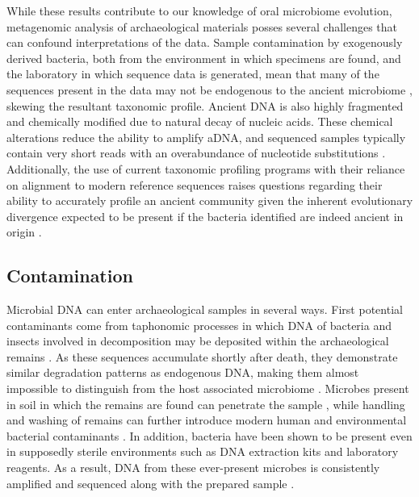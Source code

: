 \documentclass[12pt, a4paper]{article}
\begin{document}
While these results contribute to our knowledge of oral microbiome evolution, metagenomic analysis of archaeological materials posses several challenges that can confound interpretations of the data. 
Sample contamination by exogenously derived bacteria, both from the environment in which specimens are found, and the laboratory in which sequence data is generated, mean that many of the sequences present in the data may not be endogenous to the ancient microbiome \cite{Cooper:2000aa,Handt:1994aa}, skewing the resultant taxonomic profile. 
Ancient DNA is also highly fragmented and chemically modified due to natural decay of nucleic acids.
These chemical alterations reduce the ability to amplify aDNA, and sequenced samples typically contain very short reads with an overabundance  of nucleotide substitutions \cite{Briggs:2007aa}. 
Additionally, the use of current taxonomic profiling programs with their reliance on alignment to modern reference sequences \cite{Herbig2016} raises questions regarding their ability to accurately profile an ancient community given the inherent evolutionary divergence expected to be present if the bacteria identified are indeed ancient in origin \cite{Eisenhofer:2016aa}.

\subsection{Contamination}\label{sec:contamination}
Microbial DNA can enter archaeological samples in several ways. 
First potential contaminants come from taphonomic processes in which DNA of bacteria and insects involved in decomposition may be deposited within the archaeological remains \cite{Noonan:2005aa,Poinar:2006aa}. 
As these sequences accumulate shortly after death, they demonstrate similar degradation patterns as endogenous DNA, making them almost impossible to distinguish from the host associated microbiome \cite{Herbig2016}. 
Microbes present in soil in which the remains are found can penetrate the sample \cite{Noonan:2005aa}, while handling and washing of remains can further introduce modern human and environmental bacterial contaminants \cite{Pruvost:2007aa}. 
In addition, bacteria have been shown to be present even in supposedly sterile environments such as DNA extraction kits and laboratory reagents. 
As a result, DNA from these ever-present microbes is consistently amplified and sequenced along with the prepared sample \cite{Salter:2014}. 
\end{document}
